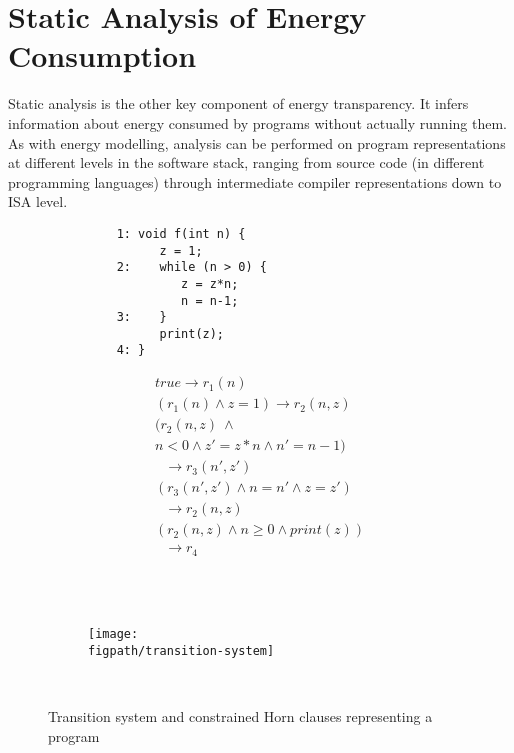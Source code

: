 
\section{Static Analysis of Energy Consumption}\label{sec:energy-analysis}

Static analysis is the other key component of energy transparency.
It infers information about energy consumed by programs without
actually running them. As with energy modelling, analysis can be performed on
program representations at different levels 
in the software stack, ranging from source code (in different programming
languages) through intermediate compiler representations down to ISA level.



\begin{figure}
  \begin{subfigure}[b]{.49\linewidth}
  \centering
         \begin{lstlisting}
    1: void f(int n) {
          z = 1;
    2:    while (n > 0) {
             z = z*n;
             n = n-1;
    3:    }
          print(z);	
    4: }		
              \end{lstlisting}
    \caption{}
  \end{subfigure}
  \hspace{0.5cm}
  \begin{subfigure}[b]{.49\linewidth}
\begin{center}
\[
     \begin{array}{l}
	true \rightarrow r_1(n)\\
	(r_1(n) \wedge z=1)  \rightarrow r_2(n,z)\\
        (r_2(n,z)~ \wedge \\
	n < 0 \wedge z'=z*n  \wedge n'=n-1)\\
         \ \ \       \rightarrow r_3(n',z')\\
        (r_3(n',z') \wedge n=n' \wedge z=z')\\
        \ \ \         \rightarrow r_2(n,z)\\
        (r_2(n,z) \wedge n \ge 0 \wedge print(z))\\
         \ \ \      \rightarrow r_4	
     \end{array}
\]
    \end{center}
    \caption{}
  \end{subfigure}\\ \\
    \begin{subfigure}[b]{\linewidth}
\begin{center}
\texttt{[image: \\figpath/transition-system]}
    \end{center}
    \caption{}
  \end{subfigure}\\

  \caption{Transition system and constrained Horn clauses representing a program}
  \label{fig-horn}
\end{figure}

